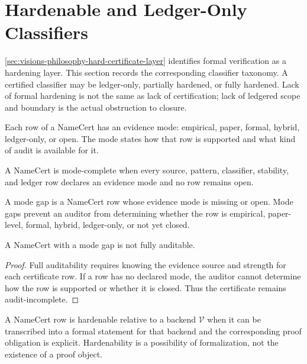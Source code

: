 \section{Hardenable and Ledger-Only Classifiers}
\label{sec:visions-philosophy-hardenable-ledger-only-classifiers}

\autoref{sec:visions-philosophy-hard-certificate-layer} identifies
formal verification as a hardening layer. This section records the
corresponding classifier taxonomy. A certified classifier may be
ledger-only, partially hardened, or fully hardened. Lack of formal
hardening is not the same as lack of certification; lack of ledgered
scope and boundary is the actual obstruction to closure.

\begin{definition}
\label{def:philosophy-evidence-mode}
Each row of a NameCert has an evidence mode: empirical, paper, formal,
hybrid, ledger-only, or open. The mode states how that row is supported
and what kind of audit is available for it.
\end{definition}

\begin{definition}
\label{def:philosophy-mode-complete-namecert}
A NameCert is mode-complete when every source, pattern, classifier,
stability, and ledger row declares an evidence mode and no row remains
open.
\end{definition}

\begin{definition}
\label{def:philosophy-mode-gap}
A mode gap is a NameCert row whose evidence mode is missing or open.
Mode gaps prevent an auditor from determining whether the row is
empirical, paper-level, formal, hybrid, ledger-only, or not yet closed.
\end{definition}

\begin{theorem}
\label{thm:philosophy-mode-gaps-prevent-full-auditability}
A NameCert with a mode gap is not fully auditable.
\end{theorem}
\begin{proof}
Full auditability requires knowing the evidence source and strength for
each certificate row. If a row has no declared mode, the auditor cannot
determine how the row is supported or whether it is closed. Thus the
certificate remains audit-incomplete.
\end{proof}

\begin{definition}
\label{def:philosophy-hardenable-row}
A NameCert row is hardenable relative to a backend $\mathcal{V}$ when
it can be transcribed into a formal statement for that backend and the
corresponding proof obligation is explicit. Hardenability is a
possibility of formalization, not the existence of a proof object.
\end{definition}

